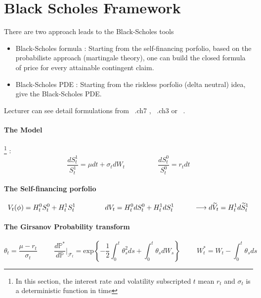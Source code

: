 \documentclass[a4paper,10pt]{article}
\begin{document}
\section{Black Scholes Framework}
There are two approach leads to the Black-Scholes tools
\begin{itemize}
 \item Black-Scholes formula : Starting from the self-financing porfolio, based on the probabiliste approach (martingale theory), one can build the closed formula of price for every attainable contingent claim. 
 \item Black-Scholes PDE : Starting from the riskless porfolio (delta neutral) idea, give the Black-Scholes PDE.
\end{itemize}
Lecturer can see detail formulations from ~\cite{ELLIOT}.ch7 , ~\cite{MAREK}.ch3 or ~\cite{rouah}.  
\paragraph{The Model} \footnote{In this section, the interest rate and volatility subscripted $t$ mean $r_t$ and $\sigma_t$ is a deterministic function in time} :
\[
\frac{dS^1_t}{S^1_t} = \mu dt + \sigma_t d W_t   \hspace{2cm} \frac{dS^0_t}{S^0_t} = r_t dt
\]
\paragraph{The Self-financing porfolio} 
\[
V_t(\phi) = H^0_t S^0_t + H^1_t S^1_t   
\hspace{1.5cm} 
dV_t = H^0_t dS^0_t + H^1_t dS^1_t 
\hspace{1cm} \longrightarrow
d\widetilde{V}_t = H^1_t d\widetilde{S}^1_t 
\]
\paragraph{The Girsanov Probability transform}
\[
\theta_t = \frac{\mu - r_t}{\sigma_t} 
\hspace{1cm} 
\frac{d\mathbb{P}^*}{d\mathbb{P}}|_{\mathcal{F}_t} = \text{exp}\left\{-\frac{1}{2} \int_0^t \theta^2_s ds + \int_0^t \theta_s dW_s \right\}
\hspace{1cm} 
W^*_t = W_t - \int_0^t \theta_s ds
\]
\end{document}
